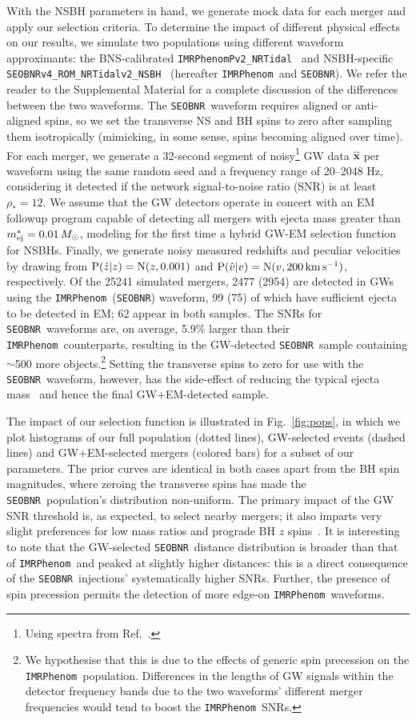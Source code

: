 \documentclass[%
 reprint,
 superscriptaddress,
 nofootinbib,
 amsmath,amssymb,
 aps,
]{revtex4-2}
\newcommand{\vobs}{\ensuremath{\hat{v}}}
\newcommand{\zobs}{\ensuremath{\hat{z}}}
\newcommand{\prob}{\ensuremath{{\rm P}}}
\newcommand{\normal}{{\rm{N}}}
\newcommand{\snrmin}{\rho_*}
\newcommand{\mejmin}{m_{\rm ej}^*}
\newcommand{\dgw}{\hat{\bm{x}}}
\newcommand{\kms}{\ensuremath{{\rm km\,s^{-1}}}}
\newcommand{\seobnr}{\texttt{SEOBNR}}
\newcommand{\seobnrfull}{\texttt{SEOBNRv4\_ROM\_NRTidalv2\_NSBH}}
\newcommand{\imrp}{\texttt{IMRPhenom}}
\newcommand{\imrpfull}{\texttt{IMRPhenomPv2\_NRTidal}}
\begin{document}
With the NSBH parameters in hand, we generate mock data for each merger and apply our selection criteria.  To determine the impact of different physical effects on our results, we simulate two populations using different waveform approximants: the BNS-calibrated \imrpfull~\cite{Dietrich_etal:2019} and NSBH-specific \seobnrfull~\cite{Matas_etal:2020} (hereafter \imrp\ and \seobnr). We refer the reader to the Supplemental Material for a complete discussion of the differences between the two waveforms. The \seobnr\ waveform requires aligned or anti-aligned spins, so we set the transverse NS and BH spins to zero after sampling them isotropically (mimicking, in some sense, spins becoming aligned over time). For each merger, we generate a 32-second segment of noisy\footnote{Using spectra from Ref.~\cite{LVCnoise}.} GW data $\dgw$ per waveform using the same random seed and a frequency range of 20--2048 Hz, considering it detected if the network signal-to-noise ratio (SNR) is at least $\snrmin = 12$. We assume that the GW detectors operate in concert with an EM followup program capable of detecting all mergers with ejecta mass greater than $\mejmin = 0.01\,M_\odot$, modeling for the first time a hybrid GW-EM selection function for NSBHs. Finally, we generate noisy measured redshifts and peculiar velocities by drawing from $\prob(\zobs|z)=\normal(z,0.001)$ and $\prob(\vobs|v)=\normal(v,200\,\kms)$, respectively. Of the 25241 simulated mergers, 2477 (2954) are detected in GWs using the \imrp\ (\seobnr) waveform, 99 (75) of which have sufficient ejecta to be detected in EM; 62 appear in both samples. The SNRs for \seobnr\ waveforms are, on average, 5.9\% larger than their \imrp\ counterparts, resulting in the GW-detected \seobnr\ sample containing $\sim$500 more objects.\footnote{We hypothesise that this is due to the effects of generic spin precession on the \imrp\ population. Differences in the lengths of GW signals within the detector frequency bands due to the two waveforms' different merger frequencies would tend to boost the \imrp\ SNRs.}  Setting the transverse spins to zero for use with the \seobnr\ waveform, however, has the side-effect of reducing the typical ejecta mass~\cite{Foucart_etal:2018} and hence the final GW+EM-detected sample.

The impact of our selection function is illustrated in Fig.~\ref{fig:pops}, in which we plot histograms of our full population (dotted lines), GW-selected events (dashed lines) and GW+EM-selected mergers (colored bars) for a subset of our parameters. The prior curves are identical in both cases apart from the BH spin magnitudes, where zeroing the transverse spins has made the \seobnr\ population's distribution non-uniform. The primary impact of the GW SNR threshold is, as expected, to select nearby mergers; it also imparts very slight preferences for low mass ratios and prograde BH $z$ spins~\cite{Ng_etal:2018}. It is interesting to note that the GW-selected \seobnr\ distance distribution is broader than that of \imrp\ and peaked at slightly higher distances: this is a direct consequence of the \seobnr\ injections' systematically higher SNRs. Further, the presence of spin precession permits the detection of more edge-on \imrp\ waveforms.
\end{document}
